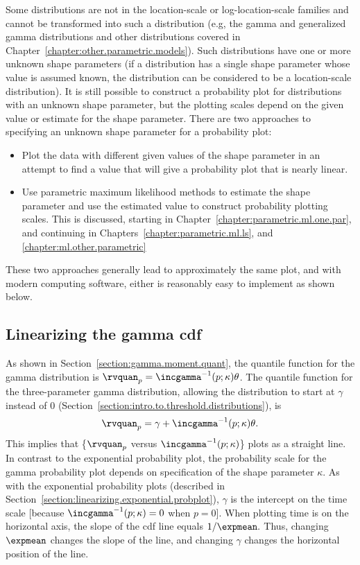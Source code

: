 Some distributions are not in the location-scale or
log-location-scale families and cannot be transformed into such a
distribution (e.g, the gamma and generalized gamma distributions and
other distributions covered in
Chapter~\ref{chapter:other.parametric.models}).  Such distributions
have one or more unknown shape parameters (if a distribution has a
single shape parameter whose value is assumed known, the
distribution can be considered to be a location-scale
distribution). It is still possible to construct a probability plot
for distributions with an unknown shape parameter, but the plotting
scales depend on the given value or estimate for the shape
parameter.  There are two approaches to specifying an unknown shape
parameter for a probability plot:
\begin{itemize}
\item
Plot the data with different given values of the shape parameter in an
attempt to find a value that will give a probability plot that is
nearly linear.
\item
Use parametric maximum likelihood methods 
to estimate the shape parameter and use the estimated value to
construct probability plotting scales. This is discussed, starting in
Chapter~\ref{chapter:parametric.ml.one.par}, and continuing in
Chapters~\ref{chapter:parametric.ml.ls}, and \ref{chapter:ml.other.parametric}
\end{itemize}
These two approaches generally lead to approximately the same plot,
and with modern computing software, either is reasonably easy to
implement as shown below.

\subsection{Linearizing the gamma cdf}
\label{section:probplot.gamma}
As shown in Section~\ref{section:gamma.moment.quant},
the quantile function for the gamma distribution is
$\rvquan_{p}=\incgamma^{-1}(p;\kappa) \theta$.
The quantile function for the three-parameter
gamma distribution, allowing the distribution to start at $\gamma$
instead of 0
(Section~\ref{section:intro.to.threshold.distributions}), is
\begin{displaymath}
\rvquan_{p}= \gamma + \incgamma^{-1}(p;\kappa) \theta.
\end{displaymath}
This implies that \{$\rvquan_{p}$ versus $\incgamma^{-1}(p;\kappa)$\}
plots as a straight line.  In contrast to the exponential
probability plot, the probability scale for the gamma probability plot
depends on specification of the shape parameter $\kappa$.  As with the
exponential probability plots (described in
Section~\ref{section:linearizing.exponential.probplot}), $\gamma$ is
the intercept on the time scale [because $\incgamma^{-1}(p;\kappa)=0$
when $p=0$].  When plotting time is on the horizontal axis, the slope of
the cdf line equals $1/\expmean.$ Thus, changing $\expmean$
changes the slope of the line, and changing $\gamma$ changes the
horizontal position of the line.
 
